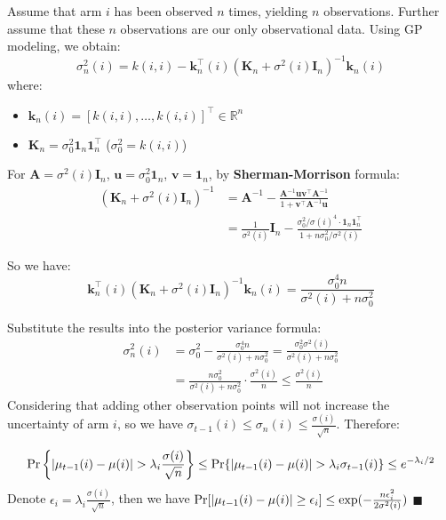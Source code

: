 \documentclass[opre,sglanonrev]{informs4}
\begin{document}
\begin{appendices}
Assume that arm $i$ has been observed $n$ times, yielding $n$ observations. Further assume that these $n$ observations are our only observational data. Using GP modeling, we obtain:
\[
\sigma_n^2(i) = k(i,i) - \mathbf{k}_n^\top(i)(\mathbf{K}_n + \sigma^2(i)\mathbf{I}_n)^{-1}\mathbf{k}_n(i)
\]
where:
\begin{itemize}
    \item $\mathbf{k}_n(i) = [k(i,i),\dots,k(i,i)]^\top \in \mathbb{R}^n$
    \item $\mathbf{K}_n = \sigma_0^2\mathbf{1}_n\mathbf{1}_n^\top$ ($\sigma_0^2 = k(i,i)$)
\end{itemize} %

For $\mathbf{A} = \sigma^2(i)\mathbf{I}_n$, $\mathbf{u} = \sigma_0^2\mathbf{1}_n$, $\mathbf{v} = \mathbf{1}_n$, by \textbf{Sherman-Morrison} formula:
\begin{equation*}
\begin{aligned}
(\mathbf{K}_n + \sigma^2(i)\mathbf{I}_n)^{-1} &= \mathbf{A}^{-1} - \frac{\mathbf{A}^{-1}\mathbf{u}\mathbf{v}^\top\mathbf{A}^{-1}}{1 + \mathbf{v}^\top\mathbf{A}^{-1}\mathbf{u}} \\
&= \frac{1}{\sigma^2(i)}\mathbf{I}_n - \frac{\sigma_0^2/\sigma(i)^4 \cdot \mathbf{1}_n\mathbf{1}_n^\top}{1 + n\sigma_0^2/\sigma^2(i)}
\end{aligned}
\end{equation*} 

So we have:
\[
\mathbf{k}_n^\top(i)(\mathbf{K}_n + \sigma^2(i)\mathbf{I}_n)^{-1}\mathbf{k}_n(i) = \frac{\sigma_0^4n}{\sigma^2(i) + n\sigma_0^2}
\]

Substitute the results into the posterior variance formula:
\begin{equation*}
\begin{aligned}
\sigma_n^2(i) &= \sigma_0^2 - \frac{\sigma_0^4n}{\sigma^2(i) + n\sigma_0^2} = \frac{\sigma_0^2\sigma^2(i)}{\sigma^2(i) + n\sigma_0^2} \\
&= \frac{n\sigma_0^2}{\sigma^2(i)+n\sigma_0^2}\cdot \frac{\sigma^2(i)}{n} \leq \frac{\sigma^2(i)}{n}
\end{aligned}
\end{equation*} 
Considering that adding other observation points will not increase the uncertainty of arm $i$, so we have $\sigma_{t-1}(i) \leq \sigma_n(i) \leq \frac{\sigma(i)}{\sqrt{n}}$. Therefore:

$$\textnormal{Pr}\left\{|\mu_{t-1}(i)-\mu(i)|>\lambda_i \frac{\sigma(i)}{\sqrt{n}}\right\}\leq\textnormal{Pr}\{|\mu_{t-1}(i)-\mu(i)|>\lambda_i \sigma_{t-1}(i)\}\leq e^{-\lambda_i/2}$$
Denote $\epsilon_i = \lambda_i \frac{\sigma(i)}{\sqrt{n}}$, then we have $\textnormal{Pr}[|\mu_{t-1}(i)-\mu(i)|\geq \epsilon_i]\leq \exp(-\frac{n\epsilon_i^2}{2\sigma^2(i)})$  \hfill $\blacksquare$


\end{appendices}
\end{document}
